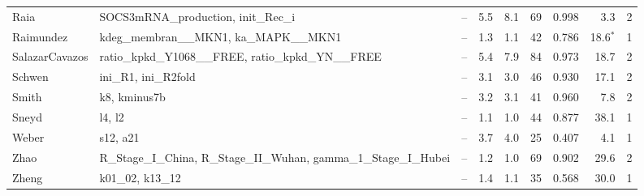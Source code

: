 \begin{longtable}{@{}>{\raggedright\arraybackslash}p{1.9cm}>{\raggedright\arraybackslash}p{3.9cm}>{\raggedright\arraybackslash}p{2.7cm}rrrrrc@{}}
Raia & SOCS3mRNA\_\allowbreak{}production, \allowbreak{}init\_\allowbreak{}Rec\_\allowbreak{}i & -- & 5.5 & 8.1 & 69 & 0.998 & 3.3 & 2 \\
Raimundez & kdeg\_\allowbreak{}membran\_\allowbreak{}\_\allowbreak{}MKN1, \allowbreak{}ka\_\allowbreak{}MAPK\_\allowbreak{}\_\allowbreak{}MKN1 & -- & 1.3 & 1.1 & 42 & 0.786 & 18.6$^{\ast}$ & 1 \\
SalazarCavazos & ratio\_\allowbreak{}kpkd\_\allowbreak{}Y1068\_\allowbreak{}\_\allowbreak{}FREE, \allowbreak{}ratio\_\allowbreak{}kpkd\_\allowbreak{}YN\_\allowbreak{}\_\allowbreak{}FREE & -- & 5.4 & 7.9 & 84 & 0.973 & 18.7 & 2 \\
Schwen & ini\_\allowbreak{}R1, \allowbreak{}ini\_\allowbreak{}R2fold & -- & 3.1 & 3.0 & 46 & 0.930 & 17.1 & 2 \\
Smith & k8, \allowbreak{}kminus7b & -- & 3.2 & 3.1 & 41 & 0.960 & 7.8 & 2 \\
Sneyd & l4, \allowbreak{}l2 & -- & 1.1 & 1.0 & 44 & 0.877 & 38.1 & 1 \\
Weber & s12, \allowbreak{}a21 & -- & 3.7 & 4.0 & 25 & 0.407 & 4.1 & 1 \\
Zhao & R\_\allowbreak{}Stage\_\allowbreak{}I\_\allowbreak{}China, \allowbreak{}R\_\allowbreak{}Stage\_\allowbreak{}II\_\allowbreak{}Wuhan, \allowbreak{}gamma\_\allowbreak{}1\_\allowbreak{}Stage\_\allowbreak{}I\_\allowbreak{}Hubei & -- & 1.2 & 1.0 & 69 & 0.902 & 29.6 & 2 \\
Zheng & k01\_\allowbreak{}02, \allowbreak{}k13\_\allowbreak{}12 & -- & 1.4 & 1.1 & 35 & 0.568 & 30.0 & 1 \\
\bottomrule
\end{longtable}
